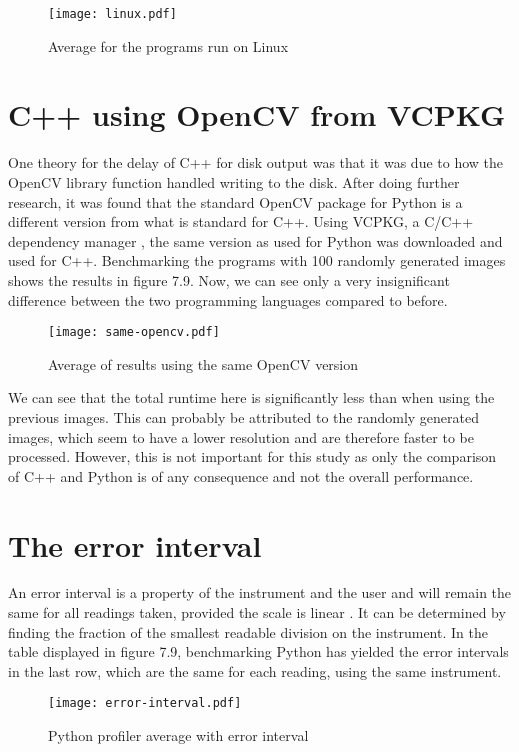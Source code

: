 \begin{figure}[H]
	\centering
	\texttt{[image: linux.pdf]}
	\caption{Average for the programs run on Linux}
	\label{figure:linux}
\end{figure}

\section{C++ using OpenCV from VCPKG}
One theory for the delay of C++ for disk output was that it was due to how the OpenCV library function handled writing to the disk. After doing further research, it was found that the standard OpenCV package for Python is a different version from what is standard for C++. Using VCPKG, a C/C++ dependency manager \cite{vcpkg}, the same version as used for Python was downloaded and used for C++. Benchmarking the programs with 100 randomly generated images shows the results in figure 7.9. Now, we can see only a very insignificant difference between the two programming languages compared to before.

\begin{figure}[H]
	\centering
	\texttt{[image: same-opencv.pdf]}
	\caption{Average of results using the same OpenCV version}
	\label{figure:same-opencv}
\end{figure}

We can see that the total runtime here is significantly less than when using the previous images. This can probably be attributed to the randomly generated images, which seem to have a lower resolution and are therefore faster to be processed. However, this is not important for this study as only the comparison of C++ and Python is of any consequence and not the overall performance.

\section{The error interval}
An error interval is a property of the instrument and the user and will remain the same for all readings taken, provided the scale is linear \cite{errorinterval}. It can be determined by finding the fraction of the smallest readable division on the instrument. In the table displayed in figure 7.9, benchmarking Python has yielded the error intervals in the last row, which are the same for each reading, using the same instrument.

\begin{figure}[H]
	\centering
	\texttt{[image: error-interval.pdf]}
	\caption{Python profiler average with error interval}
	\label{figure:error-interval}
\end{figure}

